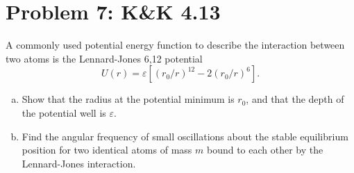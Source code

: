\documentclass[problems]{esg8012pset}
\begin{document}
\section*{Problem 7: K\&K 4.13}
  A commonly used potential energy function to describe the interaction between two atoms is the Lennard-Jones 6,12 potential
  $$U(r) = \varepsilon\left[(r_0 / r)^{12} - 2(r_0 / r)^6\right].$$
  \begin{enumerate}[(a)]
  \item Show that the radius at the potential minimum is $r_0$, and that the depth of the potential well is $\varepsilon$.
    \item Find the angular frequency of small oscillations about the stable equilibrium position for two identical atoms of mass $m$ bound to each other by the Lennard-Jones interaction.
  \end{enumerate}
\end{document}
